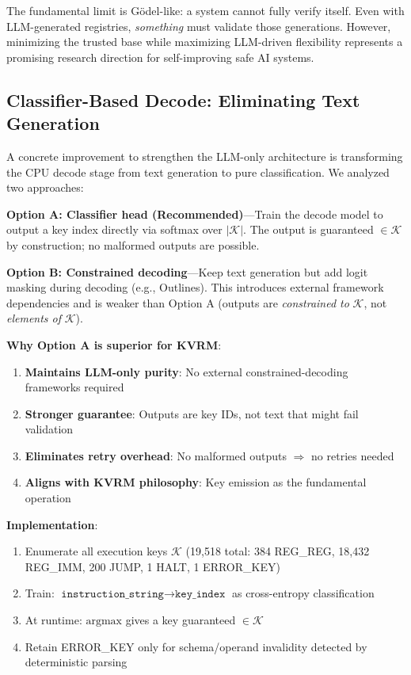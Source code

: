 \documentclass[11pt,a4paper]{article}
\begin{document}
The fundamental limit is G\"{o}del-like: a system cannot fully verify itself. Even with LLM-generated registries, \textit{something} must validate those generations. However, minimizing the trusted base while maximizing LLM-driven flexibility represents a promising research direction for self-improving safe AI systems.

\subsection{Classifier-Based Decode: Eliminating Text Generation}
\label{subsec:classifier-decode}

A concrete improvement to strengthen the LLM-only architecture is transforming the CPU decode stage from text generation to pure classification. We analyzed two approaches:

\textbf{Option A: Classifier head (Recommended)}---Train the decode model to output a key index directly via softmax over $|\mathcal{K}|$. The output is guaranteed $\in \mathcal{K}$ by construction; no malformed outputs are possible.

\textbf{Option B: Constrained decoding}---Keep text generation but add logit masking during decoding (e.g., Outlines). This introduces external framework dependencies and is weaker than Option A (outputs are \textit{constrained to} $\mathcal{K}$, not \textit{elements of} $\mathcal{K}$).

\textbf{Why Option A is superior for KVRM}:
\begin{enumerate}
    \item \textbf{Maintains LLM-only purity}: No external constrained-decoding frameworks required
    \item \textbf{Stronger guarantee}: Outputs are key IDs, not text that might fail validation
    \item \textbf{Eliminates retry overhead}: No malformed outputs $\Rightarrow$ no retries needed
    \item \textbf{Aligns with KVRM philosophy}: Key emission as the fundamental operation
\end{enumerate}

\textbf{Implementation}:
\begin{enumerate}
    \item Enumerate all execution keys $\mathcal{K}$ (19,518 total: 384 REG\_REG, 18,432 REG\_IMM, 200 JUMP, 1 HALT, 1 ERROR\_KEY)
    \item Train: $\texttt{instruction\_string} \rightarrow \texttt{key\_index}$ as cross-entropy classification
    \item At runtime: $\text{argmax}$ gives a key guaranteed $\in \mathcal{K}$
    \item Retain ERROR\_KEY only for schema/operand invalidity detected by deterministic parsing
\end{enumerate}
\end{document}
